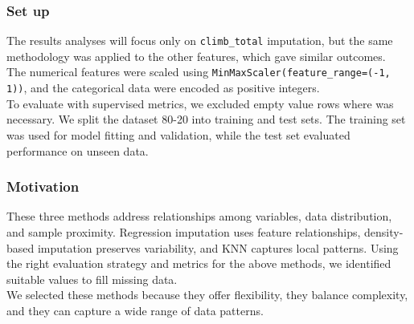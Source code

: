 \documentclass[a4paper, twoside]{article}
\begin{document}
\subsubsection{Set up}
The results analyses will focus only on \texttt{climb\_total} imputation, but the same methodology was applied to the other features, which gave similar outcomes.\\
The numerical features were scaled using \texttt{MinMaxScaler(feature\_range=(-1, 1))}, and the categorical data were encoded as positive integers. \\
To evaluate with supervised metrics, we excluded empty value rows where was necessary. We split the dataset 80-20 into training and test sets.
The training set was used for model fitting and validation, while the test set evaluated performance on unseen data.

\subsubsection{Motivation}
These three methods address relationships among variables, data distribution, and sample proximity. Regression imputation uses feature relationships, density-based imputation preserves variability, and KNN captures local patterns.
Using the right evaluation strategy and metrics for the above methods, we identified suitable values to fill missing data.
\\
We selected these methods because they offer flexibility, they balance complexity, and they can capture a wide range of data patterns.
\end{document}
